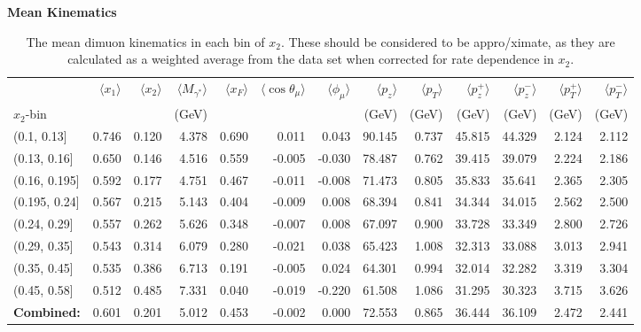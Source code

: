 \begin{table}
	\centering
	\caption*{\textbf{Mean Kinematics}}
	\begin{tabular}{lrrrrrrrrrrrr}
		\toprule
		{} &    $\langle x_1 \rangle$ &    $\langle x_2\rangle$ &   $\langle M_{\gamma^*}\rangle$ &     $\langle x_F\rangle$ &  $\langle \cos\theta_\mu\rangle$ &    $\langle \phi_\mu\rangle$ &     $\langle p_z\rangle$ &    $\langle p_T\rangle$ &     $\langle p_z^+\rangle$ &    $\langle p_z^-\rangle$  &    $\langle p_T^+\rangle$ &   $\langle p_T^-\rangle$  \\
		$x_2$-bin            &        &        &   (GeV)     &        &        &        &     (GeV)    &   (GeV)     &    (GeV)     &   (GeV)      &   (GeV)     &   (GeV)     \\
		\midrule
		(0.1, 0.13]   &  0.746 &  0.120 &  4.378 &  0.690 &  0.011 &  0.043 &  90.145 &  0.737 &  45.815 &  44.329 &  2.124 &  2.112 \\
		\rowcol (0.13, 0.16]  &  0.650 &  0.146 &  4.516 &  0.559 & -0.005 & -0.030 &  78.487 &  0.762 &  39.415 &  39.079 &  2.224 &  2.186 \\
		(0.16, 0.195] &  0.592 &  0.177 &  4.751 &  0.467 & -0.011 & -0.008 &  71.473 &  0.805 &  35.833 &  35.641 &  2.365 &  2.305 \\
		\rowcol (0.195, 0.24] &  0.567 &  0.215 &  5.143 &  0.404 & -0.009 &  0.008 &  68.394 &  0.841 &  34.344 &  34.015 &  2.562 &  2.500 \\
		(0.24, 0.29]  &  0.557 &  0.262 &  5.626 &  0.348 & -0.007 &  0.008 &  67.097 &  0.900 &  33.728 &  33.349 &  2.800 &  2.726 \\
		\rowcol (0.29, 0.35]  &  0.543 &  0.314 &  6.079 &  0.280 & -0.021 &  0.038 &  65.423 &  1.008 &  32.313 &  33.088 &  3.013 &  2.941 \\
		(0.35, 0.45]  &  0.535 &  0.386 &  6.713 &  0.191 & -0.005 &  0.024 &  64.301 &  0.994 &  32.014 &  32.282 &  3.319 &  3.304 \\
		\rowcol (0.45, 0.58]  &  0.512 &  0.485 &  7.331 &  0.040 & -0.019 & -0.220 &  61.508 &  1.086 &  31.295 &  30.323 &  3.715 &  3.626 \\
		\bottomrule
		\textbf{Combined:} & 0.601 &  0.201 &  5.012 &  0.453 & -0.002 & 0.000 & 72.553 &  0.865 &  36.444 &  36.109 &  2.472 & 2.441 \\
	\end{tabular}
	\caption{The mean dimuon kinematics in each bin of $x_2$. These should be considered to be appro/ximate, as they are
		calculated as a weighted average from the data set when corrected for rate dependence in $x_2$.}
	\label{tab:mean-kin-x2}
\end{table}

